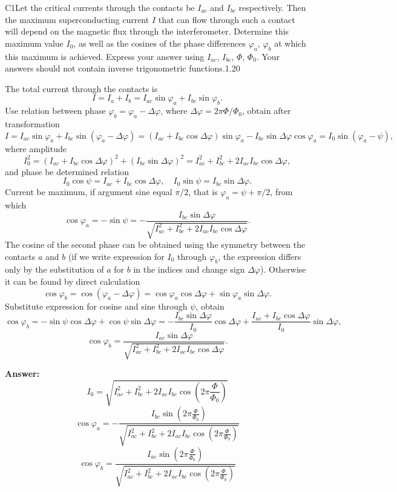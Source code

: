 \documentclass[11pt,a4paper]{article}
\begin{document}
\begin{solcard}{C1}{Let the critical currents through the contacts be $I_{ac}$ and $I_{bc}$ respectively. Then the maximum superconducting current $I$ that can flow through such a contact will depend on the magnetic flux through the interferometer. Determine this maximum value $I_0$, as well as the cosines of the phase differences $\varphi_a$, $\varphi_b$ at which this maximum is achieved. Express your answer using $I_{ac}$, $I_{bc}$, $\Phi$, $\Phi_0$. Your answers should not contain inverse trigonometric functions.}{1.20}

The total current through the contacts is $$ I = I_a + I_b = I_{ac} \sin \varphi_{a} + I_{bc} \sin \varphi_{b}. $$Use relation between phase $\varphi_b = \varphi_a - \Delta \varphi$, where $\Delta \varphi = 2\pi \Phi/\Phi_0$, obtain after transformation $$ I = I_{ac} \sin \varphi_a + I_{bc} \sin (\varphi_a - \Delta \varphi) = (I_{ac} + I_{bc} \cos \Delta \varphi) \sin \varphi_a  - I_{bc} \sin \Delta \varphi \cos \varphi_a = I_0 \sin (\varphi_a - \psi), $$where amplitude $$ I_0^2 = (I_{ac} + I_{bc} \cos \Delta \varphi)^2 + (I_{bc} \sin\Delta \varphi)^2 = I_{ac}^2 + I_{bc}^2 + 2 I_{ac} I_{bc} \cos \Delta \varphi, $$and phase be determined relation $$ I_0 \cos \psi = I_{ac} + I_{bc} \cos \Delta \varphi, \quad I_0 \sin \psi = I_{bc} \sin \Delta \varphi. $$Current be maximum, if argument sine equal $\pi/2$, that is $\varphi_a = \psi + \pi/2$, from which $$ \cos \varphi_a  = - \sin \psi= - \frac{I_{bc} \sin \Delta \varphi}{\sqrt{ I_{ac}^2 + I_{bc}^2 + 2 I_{ac} I_{bc} \cos \Delta \varphi}}. $$The cosine of the second phase can be obtained using the symmetry between the contacts $a$ and $b$ (if we write expression for $I_0$ through $\varphi_b$, the expression differs only by the substitution of $a$ for $b$ in the indices and change sign $\Delta \varphi$). Otherwise it can be found by direct calculation $$ \cos \varphi_b = \cos (\varphi_a - \Delta \varphi) = \cos \varphi_a \cos \Delta \varphi + \sin \varphi_a \sin \Delta \varphi. $$Substitute expression for cosine and sine through $\psi$, obtain $$ \cos \varphi_b = - \sin \psi \cos \Delta \varphi+ \cos \psi \sin \Delta \varphi = - \frac{I_{bc} \sin \Delta \varphi}{I_0} \cos \Delta \varphi + \frac{I_{ac} + I_{bc} \cos \Delta \varphi}{I_0} \sin \Delta \varphi, $$$$ \cos \varphi_b = \frac{I_{ac} \sin \Delta \varphi}{\sqrt{ I_{ac}^2 + I_{bc}^2 + 2 I_{ac} I_{bc} \cos \Delta \varphi}}. $$

\par\smallskip\noindent\textbf{Answer:} $$ I_0 = \sqrt{I_{ac}^2 + I_{bc}^2 + 2 I_{ac} I_{bc} \cos \left( 2\pi \frac{\Phi}{\Phi_0}\right)} $$$$ \cos \varphi_a = - \frac{I_{bc} \sin \left( 2\pi \frac{\Phi}{\Phi_0}\right)}{ \sqrt{I_{ac}^2 + I_{bc}^2 + 2 I_{ac} I_{bc} \cos \left( 2\pi \frac{\Phi}{\Phi_0}\right)}} $$$$ \cos \varphi_b =  \frac{I_{ac} \sin \left( 2\pi \frac{\Phi}{\Phi_0}\right)}{ \sqrt{I_{ac}^2 + I_{bc}^2 + 2 I_{ac} I_{bc} \cos \left( 2\pi \frac{\Phi}{\Phi_0}\right)}} $$
\end{solcard}
\end{document}
